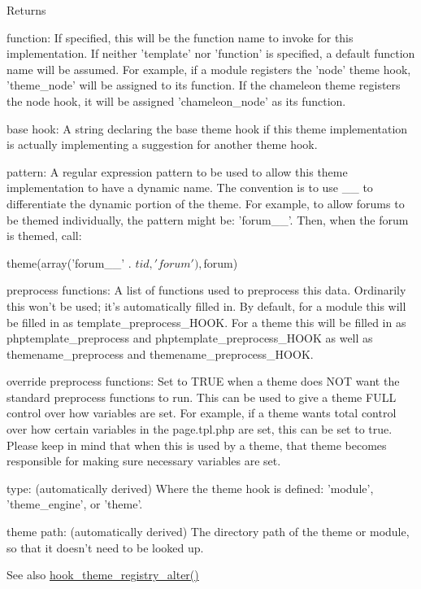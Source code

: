 \begin{DoxyReturn}{Returns}
\begin{DoxyItemize}
\item function: If specified, this will be the function name to invoke for this implementation. If neither 'template' nor 'function' is specified, a default function name will be assumed. For example, if a module registers the 'node' theme hook, 'theme\_\-node' will be assigned to its function. If the chameleon theme registers the node hook, it will be assigned 'chameleon\_\-node' as its function.
\item base hook: A string declaring the base theme hook if this theme implementation is actually implementing a suggestion for another theme hook.
\item pattern: A regular expression pattern to be used to allow this theme implementation to have a dynamic name. The convention is to use \_\-\_\- to differentiate the dynamic portion of the theme. For example, to allow forums to be themed individually, the pattern might be: 'forum\_\-\_\-'. Then, when the forum is themed, call: 
\begin{DoxyCode}
     theme(array('forum__' . $tid, 'forum'), $forum)
\end{DoxyCode}

\item preprocess functions: A list of functions used to preprocess this data. Ordinarily this won't be used; it's automatically filled in. By default, for a module this will be filled in as template\_\-preprocess\_\-HOOK. For a theme this will be filled in as phptemplate\_\-preprocess and phptemplate\_\-preprocess\_\-HOOK as well as themename\_\-preprocess and themename\_\-preprocess\_\-HOOK.
\item override preprocess functions: Set to TRUE when a theme does NOT want the standard preprocess functions to run. This can be used to give a theme FULL control over how variables are set. For example, if a theme wants total control over how certain variables in the page.tpl.php are set, this can be set to true. Please keep in mind that when this is used by a theme, that theme becomes responsible for making sure necessary variables are set.
\item type: (automatically derived) Where the theme hook is defined: 'module', 'theme\_\-engine', or 'theme'.
\item theme path: (automatically derived) The directory path of the theme or module, so that it doesn't need to be looked up.
\end{DoxyItemize}
\end{DoxyReturn}
\begin{DoxySeeAlso}{See also}
\hyperlink{group__hooks_gadd6cabb9ce825efccefb4918321932a5}{hook\_\-theme\_\-registry\_\-alter()} 
\end{DoxySeeAlso}
